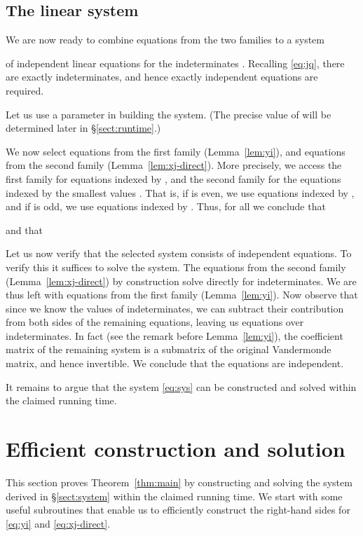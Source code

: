 \documentclass{amsart}
\begin{document}
\subsection{The linear system}
We are now ready to combine equations from the two families to a system 

of independent linear equations for the indeterminates 
. Recalling \eqref{eq:jq}, there are exactly
 indeterminates, and hence exactly 
independent equations are required.

Let us use a parameter  
in building the system. (The precise value of  will be 
determined later in \S\ref{sect:runtime}.)

We now select  equations 
from the first family (Lemma~\ref{lem:yi}), and  equations
from the second family (Lemma~\ref{lem:xj-direct}).
More precisely, we access the first family for  
equations indexed by , and the second family 
for the  equations indexed by the smallest  values . 
That is, if  is even, we use equations indexed by 
, and if  is odd, we use 
equations indexed by .
Thus, for all  we conclude that 

and that 


Let us now verify that the selected system consists of independent 
equations. To verify this it suffices to solve the system.
The equations from the second family (Lemma~\ref{lem:xj-direct}) 
by construction solve directly for  indeterminates. 
We are thus left with  equations from the first family
(Lemma~\ref{lem:yi}). Now observe that since we know
the values of  indeterminates, we can subtract their
contribution from both sides of the remaining equations, leaving
us  equations over  indeterminates. In fact (see the remark 
before Lemma~\ref{lem:yi}), the coefficient matrix of the remaining
system is a  submatrix of the original Vandermonde matrix,
and hence invertible. We conclude that the equations are independent.

It remains to argue that the system \eqref{eq:sys} can be constructed
and solved within the claimed running time.

\section{Efficient construction and solution}
\label{sect:solving}

This section proves Theorem~\ref{thm:main} by constructing and
solving the system derived in \S\ref{sect:system} within
the claimed running time. We start with some useful subroutines 
that enable us to efficiently construct the right-hand sides 
for \eqref{eq:yi} and \eqref{eq:xj-direct}.
\end{document}
